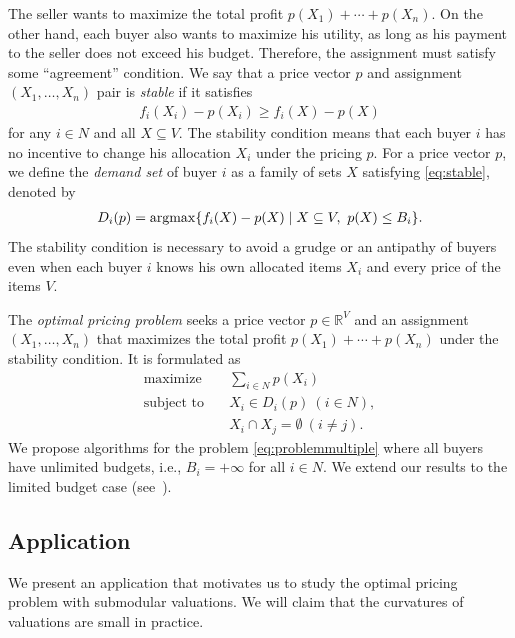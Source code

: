 \documentclass[letterpaper]{article}
\newcommand{\argmax}{\operatornamewithlimits{argmax}}
\theoremstyle{definition}
\begin{document}
The seller wants to maximize the total profit $p(X_1) + \cdots + p(X_n)$.
On the other hand, each buyer also wants to maximize his utility, as long as his payment to the seller does not exceed his budget.
Therefore, the assignment must satisfy some ``agreement'' condition.
We say that a price vector $p$ and assignment $(X_1, \ldots, X_n)$ pair is \emph{stable}
if it satisfies
\begin{align}
\label{eq:stable}
f_i(X_i) - p(X_i) \ge f_i(X) - p(X)
\end{align}
for any $i \in N$ and all $X \subseteq V$.
The stability condition means that each buyer $i$ has no incentive to change his allocation $X_i$ under the pricing $p$.
For a price vector $p$, we define the \emph{demand set} of buyer $i$ as a family of sets $X$ satisfying \eqref{eq:stable}, denoted by
\begin{align}\label{eq:demandset}
D_i(p) = \argmax \{ f_i(X) - p(X) \mid X \subseteq V, \ p(X) \leq B_i \}.
\end{align}
The stability condition is necessary to avoid a grudge or an antipathy of buyers even when each buyer $i$ knows his own allocated items $X_i$ and every price of the items $V$.


The \emph{optimal pricing problem} %
seeks a price vector $p\in \mathbb{R}^V$ and an assignment $(X_1, \ldots, X_n)$ that maximizes the total profit $p(X_1) + \cdots + p(X_n)$ under the stability condition.
It is formulated as
\begin{align}
\text{maximize}&\textstyle \quad \sum_{i\in N}p(X_i)  \nonumber \\
\text{subject to}&\quad X_i \in D_i(p) ~(i \in N), \label{eq:problemmultiple} \\
&\quad X_i \cap X_j = \emptyset ~(i \neq j). \nonumber
\end{align}
We propose algorithms for the problem \eqref{eq:problemmultiple} where all buyers have unlimited budgets, i.e., $B_i = +\infty$ for all $i \in N$.
We extend our results to the limited budget case (see~\cite{maehara2017optimal}).

\subsection{Application}
\label{subsec:budgetallocation}


We present an application that motivates us to study the optimal pricing problem with submodular valuations.
We will claim that the curvatures of valuations are small in practice.
\end{document}
